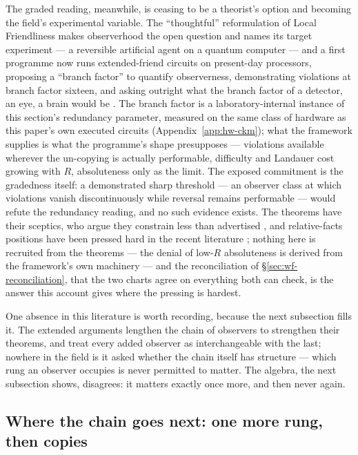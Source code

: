 The graded reading, meanwhile, is ceasing to be a theorist's option and becoming
the field's experimental variable. The ``thoughtful'' reformulation of Local
Friendliness makes observerhood the open question and names its target
experiment --- a reversible artificial agent on a quantum computer
\autocite{wisemancavalcantirieffel2023thoughtful} --- and a first programme now
runs extended-friend circuits on present-day processors, proposing a ``branch
factor'' to quantify observerness, demonstrating violations at branch factor
sixteen, and asking outright what the branch factor of a detector, an eye, a
brain would be \autocite{russozeng2025branch}. The branch factor is a
laboratory-internal instance of this section's redundancy parameter, measured on
the same class of hardware as this paper's own executed circuits
(Appendix~\ref{app:hw-ckm}); what the framework supplies is what the programme's
shape presupposes --- violations available wherever the un-copying is actually
performable, difficulty and Landauer cost growing with $R$, absoluteness only as
the limit. The exposed commitment is the gradedness itself: a demonstrated sharp
threshold --- an observer class at which violations vanish discontinuously while
reversal remains performable --- would refute the redundancy reading, and no
such evidence exists. The theorems have their sceptics, who argue they constrain
less than advertised \autocite{okon2025reassessing}, and relative-facts
positions have been pressed hard in the recent literature
\autocite{lawrencemarkiewiczzukowski2023relative}; nothing here is recruited
from the theorems --- the denial of low-$R$ absoluteness is derived from the
framework's own machinery --- and the reconciliation of
\S\ref{sec:wf-reconciliation}, that the two charts agree on everything both can
check, is the answer this account gives where the pressing is hardest.

One absence in this literature is worth recording, because the next subsection
fills it. The extended arguments lengthen the chain of observers to strengthen
their theorems, and treat every added observer as interchangeable with the last;
nowhere in the field is it asked whether the chain itself has structure ---
which rung an observer occupies is never permitted to matter. The algebra, the
next subsection shows, disagrees: it matters exactly once more, and then never
again.



\subsection{Where the chain goes next: one more rung, then copies}
\label{sec:wf-chain-type}

